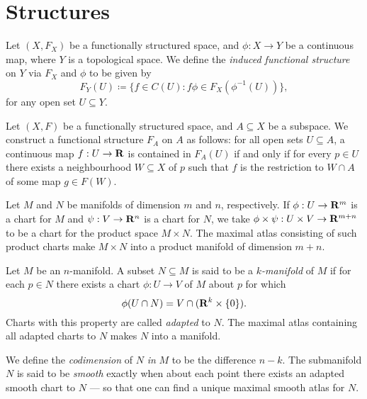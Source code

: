 \section{Structures}

\begin{definition}
\label{def:induced-functional-structure-space}
Let \((X, F_X)\) be a functionally structured space, and \(\phi: X \to Y\) be a
continuous map, where \(Y\) is a topological space. We define the \emph{induced
  functional structure} on \(Y\) via \(F_X\) and \(\phi\) to be given by
\[
F_Y(U) \coloneq \{f \in C(U) \colon f \phi \in F_X(\phi^{-1}(U))\},
\]
for any open set \(U \subseteq Y\).
\end{definition}

\begin{definition}
\label{def:induced-func-struc-on-subspace}
Let \((X, F)\) be a functionally structured space, and \(A \subseteq X\) be a
subspace. We construct a functional structure \(F_A\) on \(A\) as follows: for
all open sets \(U \subseteq A\), a continuous map \(f: U \to \mathbf{R}\) is contained
in \(F_A(U)\) if and only if for every \(p \in U\) there exists a neighbourhood
\(W \subseteq X\) of \(p\) such that \(f\) is the restriction to \(W \cap A\) of
some map \(g \in F(W)\).
\end{definition}

\begin{definition}
\label{def:product-manifold}
Let \(M\) and \(N\) be manifolds of dimension \(m\) and \(n\), respectively. If
\(\phi: U \to \mathbf{R}^m\) is a chart for \(M\) and \(\psi: V \to \mathbf{R}^n\) is a chart
for \(N\), we take \(\phi \times \psi: U \times V \to \mathbf{R}^{m + n}\) to be a chart
for the product space \(M \times N\). The maximal atlas consisting of such
product charts make \(M \times N\) into a product manifold of dimension
\(m + n\).
\end{definition}

\begin{definition}[Submanifold]
\label{def:submanifold}
Let \(M\) be an \(n\)-manifold. A subset \(N \subseteq M\) is said to be a
\emph{\(k\)-manifold} of \(M\) if for each \(p \in N\) there exists a chart
\(\phi: U \to V\) of \(M\) about \(p\) for which
\[
\phi(U \cap N) = V \cap (\mathbf{R}^k \times \{0\}).
\]
Charts with this property are called \emph{adapted} to \(N\). The maximal atlas
containing all adapted charts to \(N\) makes \(N\) into a manifold.

We define the \emph{codimension} of \(N\) \emph{in} \(M\) to be the difference
\(n - k\). The submanifold \(N\) is said to be \emph{smooth} exactly when about
each point there exists an adapted smooth chart to \(N\) --- so that one can
find a unique maximal smooth atlas for \(N\).
\end{definition}

